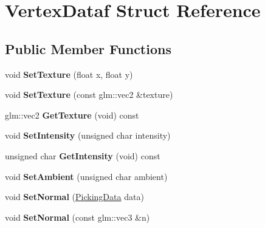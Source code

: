 \hypertarget{structVertexDataf}{\section{\-Vertex\-Dataf \-Struct \-Reference}
\label{structVertexDataf}
}
\subsection*{\-Public \-Member \-Functions}
\begin{DoxyCompactItemize}
\item 
\hypertarget{structVertexDataf_a152d55b4b719c995bda6671ba53c2507}{void {\bfseries \-Set\-Texture} (float x, float y)}\label{structVertexDataf_a152d55b4b719c995bda6671ba53c2507}

\item 
\hypertarget{structVertexDataf_a7512982046d50ccabab8436f01e959c1}{void {\bfseries \-Set\-Texture} (const glm\-::vec2 \&texture)}\label{structVertexDataf_a7512982046d50ccabab8436f01e959c1}

\item 
\hypertarget{structVertexDataf_a19fb84e7115428dff721f840532cf0f2}{glm\-::vec2 {\bfseries \-Get\-Texture} (void) const }\label{structVertexDataf_a19fb84e7115428dff721f840532cf0f2}

\item 
\hypertarget{structVertexDataf_af236fb27ae07a90ca4ab087f067d8ff4}{void {\bfseries \-Set\-Intensity} (unsigned char intensity)}\label{structVertexDataf_af236fb27ae07a90ca4ab087f067d8ff4}

\item 
\hypertarget{structVertexDataf_af09ffe52e0414d070d56198d5b7934fd}{unsigned char {\bfseries \-Get\-Intensity} (void) const }\label{structVertexDataf_af09ffe52e0414d070d56198d5b7934fd}

\item 
\hypertarget{structVertexDataf_a9ad2b6382c957ed77e7d082edcb92253}{void {\bfseries \-Set\-Ambient} (unsigned char ambient)}\label{structVertexDataf_a9ad2b6382c957ed77e7d082edcb92253}

\item 
\hypertarget{structVertexDataf_ab1743d9fec2952c29564511929dc38bf}{void {\bfseries \-Set\-Normal} (\hyperlink{unionPickingData}{\-Picking\-Data} data)}\label{structVertexDataf_ab1743d9fec2952c29564511929dc38bf}

\item 
\hypertarget{structVertexDataf_ac33bd11f533971946c18c82e5eb277fc}{void {\bfseries \-Set\-Normal} (const glm\-::vec3 \&n)}\label{structVertexDataf_ac33bd11f533971946c18c82e5eb277fc}


\end{DoxyCompactItemize}

